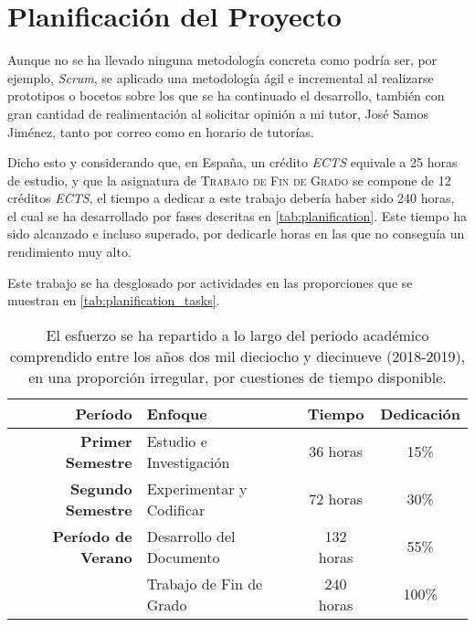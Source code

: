 \chapter{Planificación del Proyecto}\label{app:planification}

Aunque no se ha llevado ninguna metodología concreta como podría ser, por ejemplo, \textit{Scrum}, se aplicado una metodología ágil e incremental al realizarse prototipos o bocetos sobre los que se ha continuado el desarrollo, también con gran cantidad de realimentación al solicitar opinión a mi tutor, José Samos Jiménez, tanto por correo como en horario de tutorías.

Dicho esto y considerando que, en España, un crédito \textit{ECTS} equivale a 25 horas de estudio, y que la asignatura de \textsc{Trabajo de Fin de Grado} se compone de 12 créditos \textit{ECTS}, el tiempo a dedicar a este trabajo debería haber sido 240 horas, el cual se ha desarrollado por fases descritas en \autoref{tab:planification}. Este tiempo ha sido alcanzado e incluso superado, por dedicarle horas en las que no conseguía un rendimiento muy alto. 

Este trabajo se ha desglosado por actividades en las proporciones que se muestran en \autoref{tab:planification_tasks}.

\begin{table}[htbp]
	\centering
	\begin{tabular}{r || l | c  c }
		\textbf{Período} & \textbf{Enfoque} & \textbf{Tiempo} & \textbf{Dedicación} \\
		\hline\hline
		\textbf{Primer Semestre} & Estudio e Investigación & 36 horas & 15\% \\
		\textbf{Segundo Semestre} & Experimentar y Codificar & 72 horas & 30\%\\
		\textbf{Período de Verano} & Desarrollo del Documento & 132 horas & 55\%\\
		\hline
		& Trabajo de Fin de Grado & 240 horas & 100\%
	\end{tabular}
	\caption[Planificación general del proyecto]{El esfuerzo se ha repartido a lo largo del periodo académico comprendido entre los años dos mil dieciocho y diecinueve (\textsc{2018-2019}), en una proporción irregular, por cuestiones de tiempo disponible.}
	\label{tab:planification}
\end{table}

